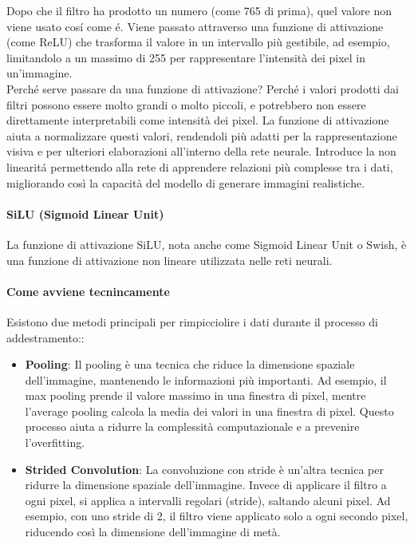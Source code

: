 Dopo che il filtro ha prodotto un numero (come 765 di prima), quel valore non viene usato cosí come é. Viene passato attraverso una funzione di attivazione (come ReLU) che trasforma il valore in un intervallo più gestibile, ad esempio, limitandolo a un massimo di 255 per rappresentare l'intensità dei pixel in un'immagine.\\

Perché serve passare da una funzione di attivazione? Perché i valori prodotti dai filtri possono essere molto grandi o molto piccoli, e potrebbero non essere direttamente interpretabili come intensità dei pixel. La funzione di attivazione aiuta a normalizzare questi valori, rendendoli più adatti per la rappresentazione visiva e per ulteriori elaborazioni all'interno della rete neurale. Introduce la non linearitá permettendo alla rete di apprendere relazioni più complesse tra i dati, migliorando così la capacità del modello di generare immagini realistiche.\\

\paragraph{SiLU (Sigmoid Linear Unit)}
La funzione di attivazione SiLU, nota anche come Sigmoid Linear Unit o Swish, è una funzione di attivazione non lineare utilizzata nelle reti neurali. 


\paragraph{Come avviene tecnincamente}
Esistono due metodi principali per rimpicciolire i dati durante il processo di addestramento::
\begin{itemize}
    \item \textbf{Pooling}: Il pooling è una tecnica che riduce la dimensione spaziale dell'immagine, mantenendo le informazioni più importanti. Ad esempio, il max pooling prende il valore massimo in una finestra di pixel, mentre l'average pooling calcola la media dei valori in una finestra di pixel. Questo processo aiuta a ridurre la complessità computazionale e a prevenire l'overfitting.
    \item \textbf{Strided Convolution}: La convoluzione con stride è un'altra tecnica per ridurre la dimensione spaziale dell'immagine. Invece di applicare il filtro a ogni pixel, si applica a intervalli regolari (stride), saltando alcuni pixel. Ad esempio, con uno stride di 2, il filtro viene applicato solo a ogni secondo pixel, riducendo così la dimensione dell'immagine di metà.
\end{itemize}

